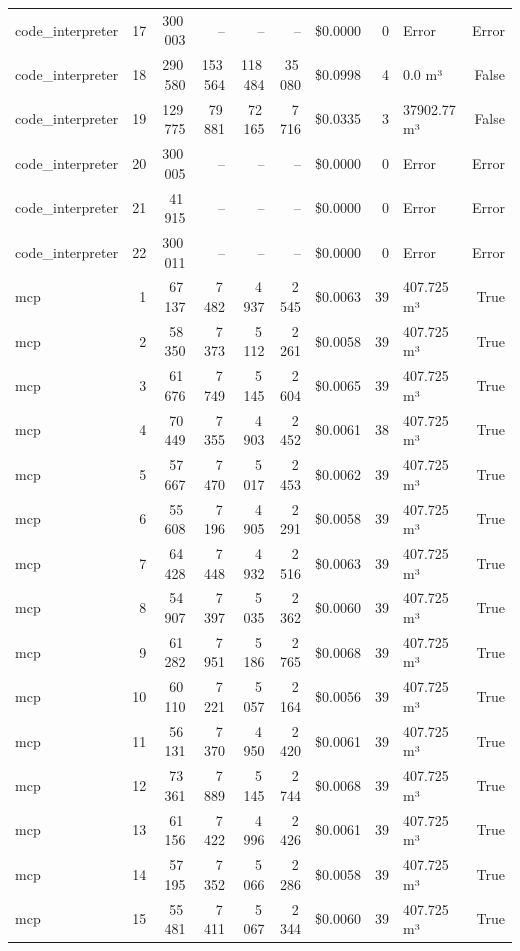 \documentclass[a4paper,11pt]{article}
\begin{document}
\begin{table}[H]
{\begin{tabular}{l r r r r r r r l r}
code\_interpreter & 17 & 300\,003 & -- & -- & -- & \$0.0000 & 0 & Error & Error \\
code\_interpreter & 18 & 290\,580 & 153\,564 & 118\,484 & 35\,080 & \$0.0998 & 4 & 0.0 m³ & False \\
code\_interpreter & 19 & 129\,775 & 79\,881 & 72\,165 & 7\,716 & \$0.0335 & 3 & 37902.77 m³ & False \\
code\_interpreter & 20 & 300\,005 & -- & -- & -- & \$0.0000 & 0 & Error & Error \\
code\_interpreter & 21 & 41\,915 & -- & -- & -- & \$0.0000 & 0 & Error & Error \\
code\_interpreter & 22 & 300\,011 & -- & -- & -- & \$0.0000 & 0 & Error & Error \\
\midrule
mcp & 1 & 67\,137 & 7\,482 & 4\,937 & 2\,545 & \$0.0063 & 39 & 407.725 m³ & True \\
mcp & 2 & 58\,350 & 7\,373 & 5\,112 & 2\,261 & \$0.0058 & 39 & 407.725 m³ & True \\
mcp & 3 & 61\,676 & 7\,749 & 5\,145 & 2\,604 & \$0.0065 & 39 & 407.725 m³ & True \\
mcp & 4 & 70\,449 & 7\,355 & 4\,903 & 2\,452 & \$0.0061 & 38 & 407.725 m³ & True \\
mcp & 5 & 57\,667 & 7\,470 & 5\,017 & 2\,453 & \$0.0062 & 39 & 407.725 m³ & True \\
mcp & 6 & 55\,608 & 7\,196 & 4\,905 & 2\,291 & \$0.0058 & 39 & 407.725 m³ & True \\
mcp & 7 & 64\,428 & 7\,448 & 4\,932 & 2\,516 & \$0.0063 & 39 & 407.725 m³ & True \\
mcp & 8 & 54\,907 & 7\,397 & 5\,035 & 2\,362 & \$0.0060 & 39 & 407.725 m³ & True \\
mcp & 9 & 61\,282 & 7\,951 & 5\,186 & 2\,765 & \$0.0068 & 39 & 407.725 m³ & True \\
mcp & 10 & 60\,110 & 7\,221 & 5\,057 & 2\,164 & \$0.0056 & 39 & 407.725 m³ & True \\
mcp & 11 & 56\,131 & 7\,370 & 4\,950 & 2\,420 & \$0.0061 & 39 & 407.725 m³ & True \\
mcp & 12 & 73\,361 & 7\,889 & 5\,145 & 2\,744 & \$0.0068 & 39 & 407.725 m³ & True \\
mcp & 13 & 61\,156 & 7\,422 & 4\,996 & 2\,426 & \$0.0061 & 39 & 407.725 m³ & True \\
mcp & 14 & 57\,195 & 7\,352 & 5\,066 & 2\,286 & \$0.0058 & 39 & 407.725 m³ & True \\
mcp & 15 & 55\,481 & 7\,411 & 5\,067 & 2\,344 & \$0.0060 & 39 & 407.725 m³ & True \\

\end{tabular}}
\end{table}
\end{document}
